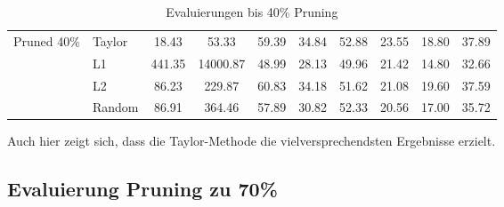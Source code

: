 \begin{table}[h]
{\begin{tabular}{l l | c c | c c c c c | r}
			\multirow{4}{*}{Pruned 40\%} & Taylor          & 18.43              & 53.33
			                             & 59.39           & 34.84              & 52.88
			                             & 23.55           & 18.80              & 37.89            \\

			                             & L1              & 441.35             & 14000.87
			                             & 48.99           & 28.13              & 49.96
			                             & 21.42           & 14.80              & 32.66            \\


			                             & L2              & 86.23              & 229.87
			                             & 60.83           & 34.18              & 51.62
			                             & 21.08           & 19.60              & 37.59            \\


			                             & Random          & 86.91              & 364.46
			                             & 57.89           & 30.82              & 52.33
			                             & 20.56           & 17.00              & 35.72            \\
			\bottomrule
			\bottomrule
		\end{tabular}}
	\caption{Evaluierungen bis 40\% Pruning}
	\label{tab:pruning40}
\end{table}

Auch hier zeigt sich, dass die Taylor-Methode die vielversprechendsten Ergebnisse erzielt.

\newpage

\subsection{Evaluierung Pruning zu 70\%}

